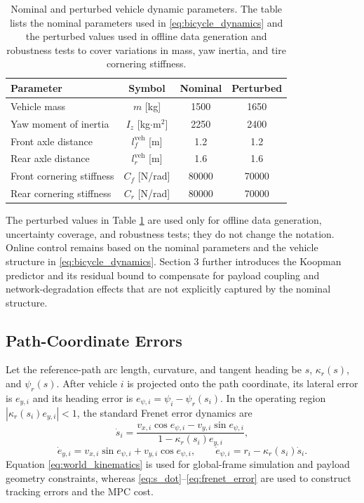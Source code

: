 \documentclass[twocolumn,3p,times,procedia]{elsarticle}
\begin{document}
\begin{table}[!tbp]
\centering
\caption{Nominal and perturbed vehicle dynamic parameters. The table lists the nominal parameters used in \eqref{eq:bicycle_dynamics} and the perturbed values used in offline data generation and robustness tests to cover variations in mass, yaw inertia, and tire cornering stiffness.}
\label{tab:vehicle_dynamic_params}
\footnotesize
\begin{tabular}{lccc}
\toprule
Parameter & Symbol & Nominal & Perturbed \\
\midrule
Vehicle mass & $m$ [kg] & 1500 & 1650\\
Yaw moment of inertia & $I_z$ [kg$\cdot$m$^2$] & 2250 & 2400\\
Front axle distance & $l_f^{\mathrm{veh}}$ [m] & 1.2 & 1.2\\
Rear axle distance & $l_r^{\mathrm{veh}}$ [m] & 1.6 & 1.6\\
Front cornering stiffness & $C_f$ [N/rad] & 80000 & 70000\\
Rear cornering stiffness & $C_r$ [N/rad] & 80000 & 70000\\
\bottomrule
\end{tabular}
\end{table}

The perturbed values in Table \ref{tab:vehicle_dynamic_params} are used only for offline data generation, uncertainty coverage, and robustness tests; they do not change the notation. Online control remains based on the nominal parameters and the vehicle structure in \eqref{eq:bicycle_dynamics}. Section 3 further introduces the Koopman predictor and its residual bound to compensate for payload coupling and network-degradation effects that are not explicitly captured by the nominal structure.

\subsection{Path-Coordinate Errors}

Let the reference-path arc length, curvature, and tangent heading be $s$, $\kappa_r(s)$, and $\psi_r(s)$. After vehicle $i$ is projected onto the path coordinate, its lateral error is $e_{y,i}$ and its heading error is $e_{\psi,i}=\psi_i-\psi_r(s_i)$. In the operating region $| \kappa_r(s_i)e_{y,i}|<1$, the standard Frenet error dynamics are
\begin{equation}
\dot s_i=\frac{v_{x,i}\cos e_{\psi,i}-v_{y,i}\sin e_{\psi,i}}
{1-\kappa_r(s_i)e_{y,i}},
\label{eq:s_dot}
\end{equation}
\begin{equation}
\dot e_{y,i}=v_{x,i}\sin e_{\psi,i}+v_{y,i}\cos e_{\psi,i},\qquad
\dot e_{\psi,i}=r_i-\kappa_r(s_i)\dot s_i .
\label{eq:frenet_error}
\end{equation}
Equation \eqref{eq:world_kinematics} is used for global-frame simulation and payload geometry constraints, whereas \eqref{eq:s_dot}--\eqref{eq:frenet_error} are used to construct tracking errors and the MPC cost.
\end{document}
